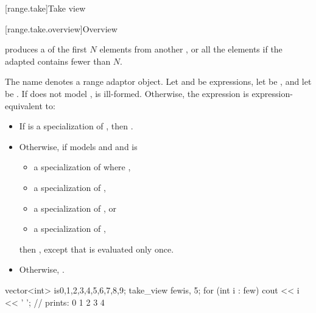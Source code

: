 [range.take]{Take view}

[range.take.overview]{Overview}

\pnum
{} produces a  of the first $N$ elements
from another , or all the elements if the adapted
 contains fewer than $N$.

\pnum
The name  denotes a
range adaptor object.
Let  and  be expressions,
let  be , and
let  be .
If  does not model
,
 is ill-formed.
Otherwise, the expression 
is expression-equivalent to:

\begin{itemize}
\item
If  is a specialization
of ,
then .

\item
Otherwise, if  models
 and 
and is
\begin{itemize}
\item a specialization of  where ,
\item a specialization of ,
\item a specialization of , or
\item a specialization of ,
\end{itemize}
then ,
except that  is evaluated only once.

\item
Otherwise, .
\end{itemize}

\pnum
\begin{example}
\begin{codeblock}
vector<int> is{0,1,2,3,4,5,6,7,8,9};
take_view few{is, 5};
for (int i : few)
  cout << i << ' '; // prints: 0 1 2 3 4
\end{codeblock}
\end{example}

